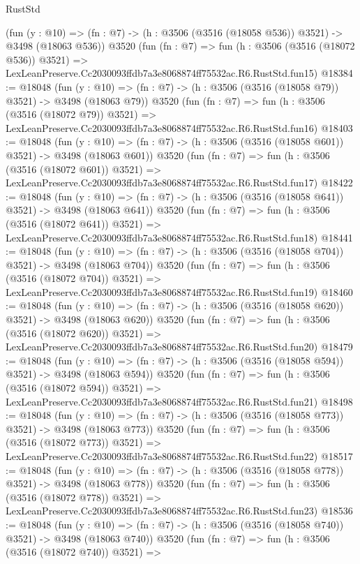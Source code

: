 \begin{lexlean}{RustStd}
\begin{coremodule}
    (fun (y : @10) => (fn : @7) -> (h : @3506 (@3516 (@18058 @536)) @3521) -> @3498 (@18063 @536))
    @3520
    (fun (fn : @7) =>
    fun (h : @3506 (@3516 (@18072 @536)) @3521) =>
    LexLeanPreserve.Cc2030093ffdb7a3e8068874ff75532ac.R6.RustStd.fun15)
@18384 := @18048
    (fun (y : @10) => (fn : @7) -> (h : @3506 (@3516 (@18058 @79)) @3521) -> @3498 (@18063 @79))
    @3520
    (fun (fn : @7) =>
    fun (h : @3506 (@3516 (@18072 @79)) @3521) =>
    LexLeanPreserve.Cc2030093ffdb7a3e8068874ff75532ac.R6.RustStd.fun16)
@18403 := @18048
    (fun (y : @10) => (fn : @7) -> (h : @3506 (@3516 (@18058 @601)) @3521) -> @3498 (@18063 @601))
    @3520
    (fun (fn : @7) =>
    fun (h : @3506 (@3516 (@18072 @601)) @3521) =>
    LexLeanPreserve.Cc2030093ffdb7a3e8068874ff75532ac.R6.RustStd.fun17)
@18422 := @18048
    (fun (y : @10) => (fn : @7) -> (h : @3506 (@3516 (@18058 @641)) @3521) -> @3498 (@18063 @641))
    @3520
    (fun (fn : @7) =>
    fun (h : @3506 (@3516 (@18072 @641)) @3521) =>
    LexLeanPreserve.Cc2030093ffdb7a3e8068874ff75532ac.R6.RustStd.fun18)
@18441 := @18048
    (fun (y : @10) => (fn : @7) -> (h : @3506 (@3516 (@18058 @704)) @3521) -> @3498 (@18063 @704))
    @3520
    (fun (fn : @7) =>
    fun (h : @3506 (@3516 (@18072 @704)) @3521) =>
    LexLeanPreserve.Cc2030093ffdb7a3e8068874ff75532ac.R6.RustStd.fun19)
@18460 := @18048
    (fun (y : @10) => (fn : @7) -> (h : @3506 (@3516 (@18058 @620)) @3521) -> @3498 (@18063 @620))
    @3520
    (fun (fn : @7) =>
    fun (h : @3506 (@3516 (@18072 @620)) @3521) =>
    LexLeanPreserve.Cc2030093ffdb7a3e8068874ff75532ac.R6.RustStd.fun20)
@18479 := @18048
    (fun (y : @10) => (fn : @7) -> (h : @3506 (@3516 (@18058 @594)) @3521) -> @3498 (@18063 @594))
    @3520
    (fun (fn : @7) =>
    fun (h : @3506 (@3516 (@18072 @594)) @3521) =>
    LexLeanPreserve.Cc2030093ffdb7a3e8068874ff75532ac.R6.RustStd.fun21)
@18498 := @18048
    (fun (y : @10) => (fn : @7) -> (h : @3506 (@3516 (@18058 @773)) @3521) -> @3498 (@18063 @773))
    @3520
    (fun (fn : @7) =>
    fun (h : @3506 (@3516 (@18072 @773)) @3521) =>
    LexLeanPreserve.Cc2030093ffdb7a3e8068874ff75532ac.R6.RustStd.fun22)
@18517 := @18048
    (fun (y : @10) => (fn : @7) -> (h : @3506 (@3516 (@18058 @778)) @3521) -> @3498 (@18063 @778))
    @3520
    (fun (fn : @7) =>
    fun (h : @3506 (@3516 (@18072 @778)) @3521) =>
    LexLeanPreserve.Cc2030093ffdb7a3e8068874ff75532ac.R6.RustStd.fun23)
@18536 := @18048
    (fun (y : @10) => (fn : @7) -> (h : @3506 (@3516 (@18058 @740)) @3521) -> @3498 (@18063 @740))
    @3520
    (fun (fn : @7) =>
    fun (h : @3506 (@3516 (@18072 @740)) @3521) =>

\end{coremodule}
\end{lexlean}
